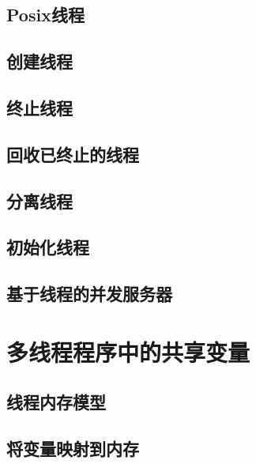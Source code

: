 \subsection{Posix线程}

\pending

\subsection{创建线程}

\pending

\subsection{终止线程}

\pending

\subsection{回收已终止的线程}

\pending

\subsection{分离线程}

\pending

\subsection{初始化线程}

\pending

\subsection{基于线程的并发服务器}

\pending

\section{多线程程序中的共享变量}

\pending

\subsection{线程内存模型}

\pending

\subsection{将变量映射到内存}

